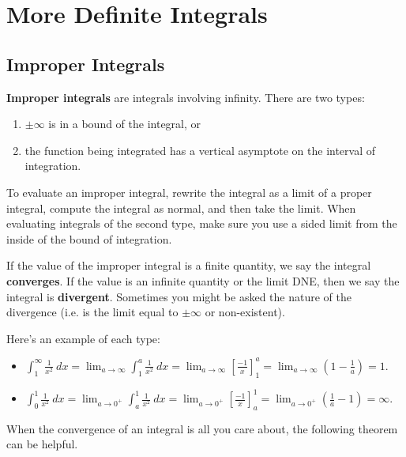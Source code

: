 \section{More Definite Integrals}

\subsection{Improper Integrals}

\textbf{Improper integrals} are integrals involving infinity. There are two types:
\begin{enumerate}
    \item $\pm\infty$ is in a bound of the integral, or
    \item the function being integrated has a vertical asymptote on the interval of integration.
\end{enumerate}


To evaluate an improper integral, rewrite the integral as a limit of a proper integral, compute the integral as normal, and then take the limit. When evaluating integrals of the second type, make sure you use a sided limit from the inside of the bound of integration.

If the value of the improper integral is a finite quantity, we say the integral \textbf{converges}. If the value is an infinite quantity or the limit DNE, then we say the integral is \textbf{divergent}. Sometimes you might be asked the nature of the divergence (i.e. is the limit equal to $\pm\infty$ or non-existent).

Here's an example of each type:

\begin{itemize}%
    \item $\displaystyle \int_1^\infty \frac{1}{x^2}\ dx
     = \lim_{a\to \infty}\int_1^a \frac{1}{x^2}\ dx 
     = \lim_{a\to \infty}\left[\frac{-1}{x}\right]_1^a 
     = \lim_{a\to \infty} \left(1-\frac{1}{a}\right)
    =1.$
    \item $\displaystyle\int_{0}^{1}\frac{1}{x^{2}}\ dx 
     = \lim_{a\to 0^+} \int_{a}^{1}\frac{1}{x^{2}}\ dx 
     = \lim_{a\to 0^+}\left[\frac{-1}{x}\right]_a^1 
     = \lim_{a\to 0^+}\left(\frac{1}{a}-1\right)
     = \infty.$
\end{itemize}


When the convergence of an integral is all you care about, the following theorem can be helpful.

